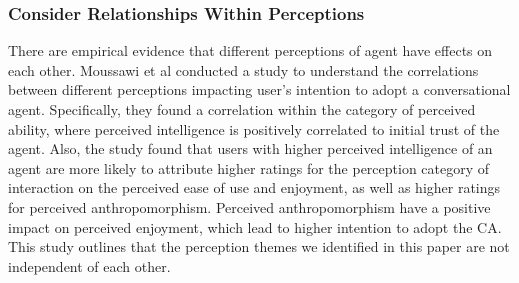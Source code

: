 \documentclass[sigconf,screen,review, anonymous]{acmart}
\newcommand{\cmt}[1]{}%
\begin{document}







\subsubsection{Consider Relationships Within Perceptions}

There are empirical evidence that different perceptions of agent have effects on each other. Moussawi et al \cite{moussawi2021perceptions}\cmt{[36]} conducted a study to understand the correlations between different perceptions impacting user's intention to adopt a conversational agent. Specifically, they found a correlation within the category of perceived ability, where perceived intelligence is positively correlated to initial trust of the agent. Also, the study found that users with higher perceived intelligence of an agent are more likely to attribute higher ratings for the perception category of interaction on the perceived ease of use and enjoyment, as well as higher ratings for perceived anthropomorphism. Perceived anthropomorphism have a positive impact on perceived enjoyment, which lead to higher intention to adopt the CA. This study outlines that the perception themes we identified in this paper are not independent of each other.
\end{document}
